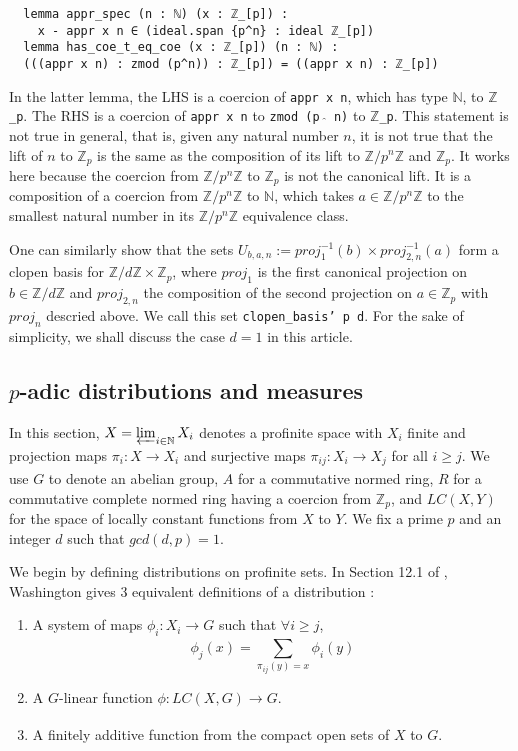 \documentclass[a4paper,UKenglish,cleveref, autoref, thm-restate]{lipics-v2021}
\newcommand{\lean}[1]{\texttt{#1}\xspace} %
\begin{document}
\begin{lstlisting}
  lemma appr_spec (n : ℕ) (x : ℤ_[p]) :  
    x - appr x n ∈ (ideal.span {p^n} : ideal ℤ_[p])
  lemma has_coe_t_eq_coe (x : ℤ_[p]) (n : ℕ) :
  (((appr x n) : zmod (p^n)) : ℤ_[p]) = ((appr x n) : ℤ_[p])
\end{lstlisting}

In the latter lemma, the LHS is a coercion of \lean{appr x n}, which has type \lean{$\mathbb{N}$}, to \lean{$\mathbb{Z}$\_p}. 
The RHS is a coercion of \lean{appr x n} to \lean{zmod (p $\hat{}$ n)} to \lean{$\mathbb{Z}$\_p}. 
This statement is not true in general, that is, given any natural number $n$, it is not true that the lift of $n$ to $\mathbb{Z}_p$ 
is the same as the composition of its lift to $\mathbb{Z}/p^n \mathbb{Z}$ and $\mathbb{Z}_p$. 
It works here because the coercion from $\mathbb{Z}/p^n \mathbb{Z}$ to $\mathbb{Z}_p$ is not the canonical lift.
It is a composition of a coercion from $\mathbb{Z}/p^n \mathbb{Z}$ to $\mathbb{N}$, which takes
$a \in \mathbb{Z}/p^n \mathbb{Z}$ to the smallest natural number in its
$\mathbb{Z}/p^n \mathbb{Z}$ equivalence class. 

One can similarly show that the sets $U_{b, a, n} := proj_1^{-1} (b) \times proj_{2,n} ^{-1} (a)$ form a clopen basis for 
$\mathbb{Z} / d \mathbb{Z} \times \mathbb{Z}_p$, where $proj_1$ is the first canonical projection on $b \in \mathbb{Z} / d \mathbb{Z}$ 
and $proj_{2,n}$ the composition of the second projection on $a \in \mathbb{Z}_p$ with $proj_n$ descried above. We call this set 
\lean{clopen\_basis' p d}. For the sake of simplicity, we shall discuss the case $d = 1$ in this article.

\subsection{$p$-adic distributions and measures}
In this section, $X = \varprojlim_{i \in \mathbb{N}} X_i$ denotes a profinite space with $X_i$ finite and
projection maps $\pi_i : X \xrightarrow[]{} X_i$ and surjective maps
$\pi_{ij} : X_i \xrightarrow[]{} X_j$ for all $i \ge j$. We use $G$ to denote an abelian group,
$A$ for a commutative normed ring, $R$ for a commutative complete normed ring having a coercion from $\mathbb{Z}_p$, 
and $LC(X,Y)$ for the space of locally constant functions from $X$ to $Y$. 
We fix a prime $p$ and an integer $d$ such that $gcd(d, p) =1$. 

We begin by defining distributions on profinite sets. In Section 12.1 of \cite{cyc}, Washington
gives 3 equivalent definitions of a distribution :
\begin{enumerate}
  \item A system of maps $\phi_i : X_i \xrightarrow[]{} G$ such that $\forall i \ge j$,
  $$ \phi_j(x) = \sum_{\pi_{ij}(y) = x} \phi_i(y) $$
  \item A $G$-linear function $\phi : LC(X, G) \xrightarrow[]{} G$.
  \item A finitely additive function from the compact open sets of $X$ to $G$.
\end{enumerate}
\end{document}
